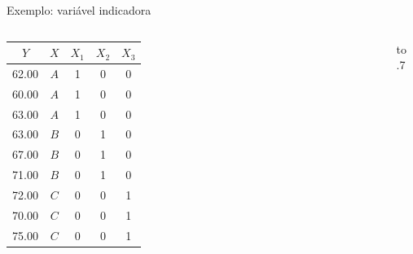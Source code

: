 \documentclass{beamer}\usepackage[]{graphicx}\usepackage[]{color}
\begin{document}
\begin{frame}{Exemplo: variável indicadora}

\begin{columns}[c]


\begin{tabular}{cc|ccc}
  \hline
  $Y$ & $X$ & $X_1$ & $X_2$ & $X_3$\\ 
  \hline
  62.00 & $A$ & 1 & 0 & 0\\ 
  60.00 & $A$ & 1 & 0 & 0\\ 
  63.00 & $A$ & 1 & 0 & 0\\ 
  63.00 & $B$ & 0 & 1 & 0\\ 
  67.00 & $B$ & 0 & 1 & 0\\ 
  71.00 & $B$ & 0 & 1 & 0\\ 
  72.00 & $C$ & 0 & 0 & 1\\ 
  70.00 & $C$ & 0 & 0 & 1\\ 
  75.00 & $C$ & 0 & 0 & 1\\ 
  \hline
\end{tabular}
\pause
{}
\vbox to .7%

\end{columns}

\end{frame}
\end{document}
